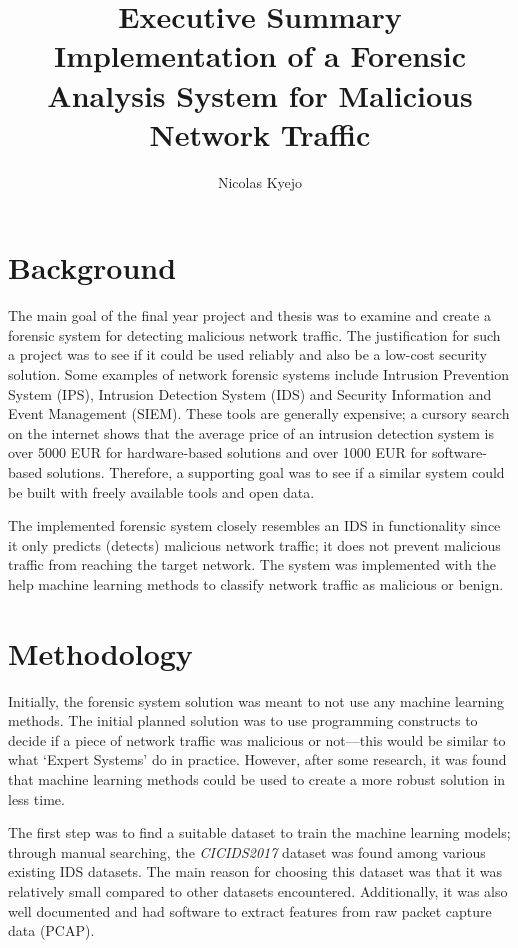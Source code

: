 \documentclass[12pt, a4paper]{article}
\title{{\color{metroorange}Executive Summary} \\

Implementation of a Forensic Analysis System for Malicious Network Traffic}
\author{{\color{metroorange}Nicolas Kyejo}}
\date{\directlua{metropoliadate()}}
\begin{document}
    \maketitle
    \thispagestyle{empty}

    \newpage
    \setcounter{page}{1}


    \section{Background}\label{sec:background}

    The main goal of the final year project and thesis was to examine and create a forensic system for detecting malicious network traffic.
    The justification for such a project was to see if it could be used reliably and also be a low-cost security solution.
    Some examples of network forensic systems include Intrusion Prevention System (IPS), Intrusion Detection System (IDS) and Security
    Information and Event Management (SIEM).
    These tools are generally expensive; a cursory search on the internet shows that the average price of an intrusion detection system is over 5000 EUR for hardware-based solutions and over 1000 EUR for software-based solutions.
    Therefore, a supporting goal was to see if a similar system could be built with freely available tools and open data.

    The implemented forensic system closely resembles an IDS in functionality since it only predicts (detects) malicious network traffic; it does not prevent malicious traffic from reaching the target network.
    The system was implemented with the help machine learning methods to classify network traffic as malicious or benign.


    \section{Methodology}\label{sec:methodology}

    Initially, the forensic system solution was meant to not use any machine learning methods.
    The initial planned solution was to use programming constructs to decide if a piece of network traffic was malicious or not---this would be similar to what `Expert Systems' do in practice.
    However, after some research, it was found that machine learning methods could be used to create a more robust solution in less time.

    The first step was to find a suitable dataset to train the machine learning models;
    through manual searching, the \textit{CICIDS2017} dataset was found among various existing IDS datasets.
    The main reason for choosing this dataset was that it was relatively small compared to other datasets encountered.
    Additionally, it was also well documented and had software to extract features from raw packet capture data (PCAP).
\end{document}
